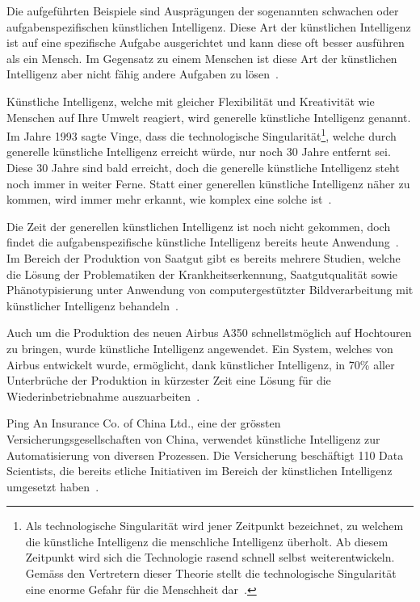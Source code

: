 Die aufgeführten Beispiele sind Ausprägungen der sogenannten schwachen oder aufgabenspezifischen künstlichen Intelligenz. Diese Art der künstlichen Intelligenz ist auf eine spezifische Aufgabe ausgerichtet und kann diese oft besser ausführen als ein Mensch. Im Gegensatz zu einem Menschen ist diese Art der künstlichen Intelligenz aber nicht fähig andere Aufgaben zu lösen~\autocite{Lu2018}.

Künstliche Intelligenz, welche mit gleicher Flexibilität und Kreativität wie Menschen auf Ihre Umwelt reagiert, wird generelle künstliche Intelligenz genannt. Im Jahre 1993 sagte Vinge, dass die technologische Singularität\footnote{Als technologische Singularität wird jener Zeitpunkt bezeichnet, zu welchem die künstliche Intelligenz die menschliche Intelligenz überholt. Ab diesem Zeitpunkt wird sich die Technologie rasend schnell selbst weiterentwickeln. Gemäss den Vertretern dieser Theorie stellt die technologische Singularität eine enorme Gefahr für die Menschheit dar~\autocite{Tredinnick2017}.}, welche durch generelle künstliche Intelligenz erreicht würde, nur noch 30 Jahre entfernt sei. Diese 30 Jahre sind bald erreicht, doch die generelle künstliche Intelligenz steht noch immer in weiter Ferne. Statt einer generellen künstliche Intelligenz näher zu kommen, wird immer mehr erkannt, wie komplex eine solche ist~\autocite{Tredinnick2017}.

Die Zeit der generellen künstlichen Intelligenz ist noch nicht gekommen, doch findet die aufgabenspezifische künstliche Intelligenz bereits heute Anwendung~\autocite{Tredinnick2017}. Im Bereich der Produktion von Saatgut gibt es bereits mehrere Studien, welche die Lösung der Problematiken der Krankheitserkennung, Saatgutqualität sowie Phänotypisierung unter Anwendung von computergestützter Bildverarbeitung mit künstlicher Intelligenz behandeln~\autocite{Patricio2018}. 

Auch um die Produktion des neuen Airbus A350 schnellstmöglich auf Hochtouren zu bringen, wurde künstliche Intelligenz angewendet. Ein System, welches von Airbus entwickelt wurde, ermöglicht, dank künstlicher Intelligenz, in 70\% aller Unterbrüche der Produktion in kürzester Zeit eine Lösung für die Wiederinbetriebnahme auszuarbeiten~\autocite{Ransbotham2017}.

Ping An Insurance Co. of China Ltd., eine der grössten Versicherungsgesellschaften von China, verwendet künstliche Intelligenz zur Automatisierung von diversen Prozessen. Die Versicherung beschäftigt 110 Data Scientists, die bereits etliche Initiativen im Bereich der künstlichen Intelligenz umgesetzt haben~\autocite{Ransbotham2017}.

